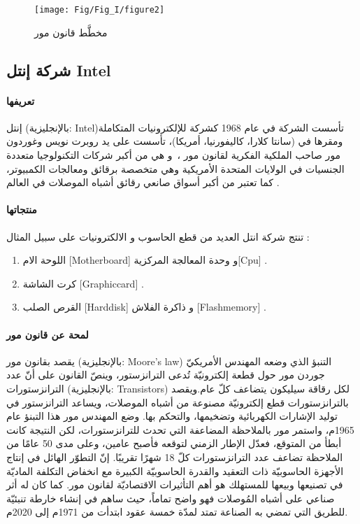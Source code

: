 \begin{figure}[h]
	\centering
	\texttt{[image: Fig/Fig\_I/figure2]}
	\caption{ مخطَّط قانون مور }
	\label{fig:figure2}
\end{figure}

\subsection{ شركة إنتل  Intel }

\paragraph{تعريفها}
إنتل (بالإنجليزية: Intel)‏ تأسست الشركة في عام 1968 كشركة للإلكترونيات المتكاملة ومقرها في (سانتا كلارا، كاليفورنيا، أمريكا)، تأسست على يد روبرت نويس وغوردون مور صاحب الملكية الفكرية لقانون مور ، و هي من أكبر شركات التكنولوجيا متعددة الجنسيات في الولايات المتحدة الأمريكية وهي متخصصة برقائق ومعالجات الكمبيوتر، كما تعتبر من أكبر أسواق صانعي رقائق أشباه الموصلات في العالم .

\paragraph{منتجاتها}
تنتج شركة انتل العديد من قطع الحاسوب و الالكترونيات على سبيل المثال :
\begin{enumerate}
	\item
	اللوحة الام [Motherboard] و وحدة المعالجة المركزية[Cpu] .
	\item
	كرت الشاشة [Graphiccard] .
	\item
	القرص الصلب [Harddisk] و ذاكرة الفلاش [Flashmemory] .
	
\end{enumerate}
\paragraph{لمحة عن قانون مور} 
يقصد بقانون مور (بالإنجليزية: Moore's law) التنبؤ الذي وضعه المهندس الأمريكيّ جوردن مور حول قطعة إلكترونيّة تُدعى الترانزستور، وينصّ القانون على أنّ عدد الترانزستورات (بالإنجليزية: Transistors) لكل رقاقة سيليكون يتضاعف كلّ عام.ويقصد بالترانزستورات قطع إلكترونيّة مصنوعة من أشباه الموصلات، ويساعد الترانزستور في توليد الإشارات الكهربائية وتضخيمها، والتحكم بها. وضع المهندس مور هذا التبنؤ عام 1965م، واستمر مور بالملاحظة المضاعفة التي تحدث للترانزستورات، لكن النتيجة كانت أبطأ من المتوقع، فعدّل الإطار الزمني لتوقعه فأصبح عامين، وعلى مدى 50 عامًا من الملاحظة تضاعف عدد الترانزستورات كلّ 18 شهرًا تقريبًا.
إنّ التطوّر الهائل في إنتاج الأجهزة الحاسوبيّة ذات التعقيد والقدرة الحاسوبيّة الكبيرة مع انخفاض التكلفة الماديّة في تصنيعها وبيعها للمستهلك هو أهم التأثيرات الاقتصاديّة لقانون مور.
كما كان له أثر صناعي على أشباه المُوصلات فهو واضح تماماً، حيث ساهم في إنشاء خارطة تنبئيّة للطريق التي تمضي به الصناعة تمتد لمدّة خمسة عقود ابتدأت من 1971م إلى 2020م.





